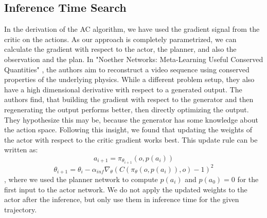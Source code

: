\subsection{Inference Time Search}
In the derivation of the AC algorithm, we have used the gradient signal from the critic on the actions. As our approach is completely parametrized, we can calculate 
the gradient with respect to the actor, the planner, and also the observation and the plan. In "Noether Networks: Meta-Learning Useful Conserved Quantities" \cite{https://arxiv.org/abs/2112.03321}, 
the authors aim to reconstruct a video sequence 
using conserved properties of the underlying physics. While a different problem setup, they also have a high dimensional derivative with respect to a 
generated output. The authors find, that 
building the gradient with respect to the generator and then regenerating the output performs better, then directly optimizing the output. They hypothesize this 
may be, because the generator has some knowledge about the action space. Following this insight, we found that updating the weights of the actor with respect to the 
critic gradient works best. This update rule can be written as:
\begin{equation}
    a_{i+1} = \pi_{\theta_{i+1}}(o, p(a_i))
\end{equation}
\begin{equation}
    \theta_{i+1} = \theta_i - \alpha_{inf} \nabla_{\theta} (C(\pi_{\theta}(o, p(a_i)), o) - 1)^2
\end{equation}
, where we used the planner network to compute $p(a_i)$ and $p(a_0) = 0$ for the first input to the actor network. 
We do not apply the updated weights to the actor after the inference, but only use them in inference time for the given trajectory. 

